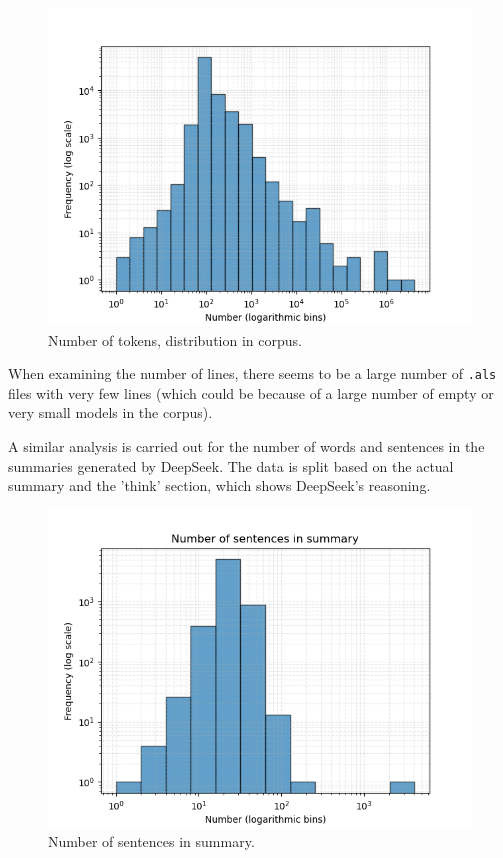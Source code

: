 \documentclass[conference]{IEEEtran}
\begin{document}
    \begin{figure}[htbp]
        \centerline{\includegraphics[width=\linewidth]{"./Number of tokens, distribution in corpus.png"}}
        \caption{Number of tokens, distribution in corpus.}
        \label{fig}
        \end{figure}

When examining the number of lines, there seems to be a large number of \verb|.als| files with very few lines (which could be because of a large number of empty or very small models in the corpus).

A similar analysis is carried out for the number of words and sentences in the summaries generated by DeepSeek. The data is split based on the actual summary and the 'think' section, which shows DeepSeek's reasoning.

\begin{figure}[htbp]
    \centerline{\includegraphics[width=\linewidth]{"./Number of sentences in summary.png"}}
    \caption{Number of sentences in summary.}
    \label{fig}
    \end{figure}
\end{document}
